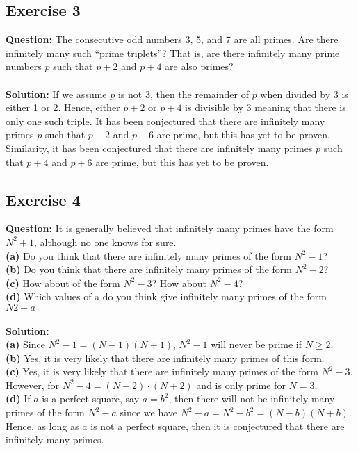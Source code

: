 \documentclass{article}
\begin{document}
\subsection{Exercise 3}
\textbf{Question:} The consecutive odd numbers 3, 5, and 7 are all primes. Are there infinitely many such “prime triplets”? That is, are there infinitely many prime numbers $p$ such that $p+2$ and $p+4$ are also primes?\\
\\\textbf{Solution:} If we assume $p$ is not 3, then the remainder of $p$ when divided by 3 is either 1 or 2. Hence, either $p+2$ or $p+4$ is divisible by 3 meaning that there is only one such triple. It has been conjectured that there are infinitely many primes $p$ such that $p+2$ and $p+6$ are prime, but this has yet to be proven. Similarity, it has been conjectured that there are infinitely many primes $p$ such that $p+4$ and $p+6$ are prime, but this has yet to be proven.
\newpage
\subsection{Exercise 4}
\textbf{Question:} It is generally believed that infinitely many primes have the form $N^2+1$, although no one knows for sure.\\
\textbf{(a)} Do you think that there are infinitely many primes of the form $N^2-1$?\\
\textbf{(b)} Do you think that there are infinitely many primes of the form $N^2-2$?\\
\textbf{(c)} How about of the form $N^2-3$? How about $N^2-4$?\\
\textbf{(d)} Which values of a do you think give infinitely many primes of the form $N2-a$\\
\\\textbf{Solution:}\\
\textbf{(a)} Since $N^2-1 = (N-1)(N+1)$, $N^2-1$ will never be prime if $N\geq 2$.\\
\textbf{(b)} Yes, it is very likely that there are infinitely many primes of this form.\\
\textbf{(c)} Yes, it is very likely that there are infinitely many primes of the form $N^2-3$. However, for $N^2-4 = (N-2)\cdot(N+2)$ and is only prime for $N = 3$.\\
\textbf{(d)} If $a$ is a perfect square, say $a = b^2$, then there will not be infinitely many primes of the form $N^2-a$ since we have $N^2-a = N^2-b^2 = (N-b)(N+b)$. Hence, as long as $a$ is not a perfect square, then it is conjectured that there are infinitely many primes.
\newpage
\end{document}
